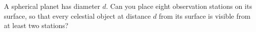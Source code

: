 A spherical planet has diameter $d$. Can you place eight observation stations on its surface, so that every celestial object at distance $d$ from its surface is visible from at least two stations?
